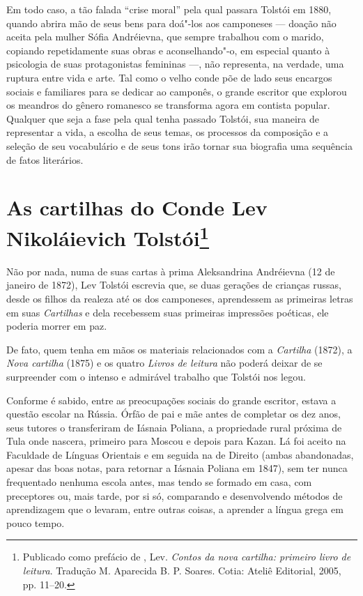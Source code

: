 Em todo caso, a tão falada ``crise moral'' pela qual passara
Tolstói em 1880, quando abrira mão de seus bens para doá"-los
aos camponeses --- doação não aceita pela mulher Sófia Andréievna,
que sempre trabalhou com o marido, copiando repetidamente suas
obras e aconselhando"-o, em especial quanto à psicologia de suas
protagonistas femininas ---, não representa, na verdade, uma
ruptura entre vida e arte. Tal como o velho conde põe de lado
seus encargos sociais e familiares para se dedicar ao camponês,
o grande escritor que explorou os meandros do gênero romanesco
se transforma agora em contista popular. Qualquer que seja a
fase pela qual tenha passado Tolstói, sua maneira de
representar a vida, a escolha de seus temas, os processos da
composição e a seleção de seu vocabulário e de seus tons irão
tornar sua biografia uma sequência de fatos literários.

\chapter{As cartilhas do Conde Lev Nikoláievich Tolstói\footnote{Publicado como prefácio de \protect{}, Lev. \emph{Contos da nova cartilha: primeiro livro de leitura}. Tradução M. Aparecida B. P. Soares. Cotia: Ateliê Editorial, 2005, pp. 11--20.}}
\label{cartilhas}

Não por nada, numa de suas cartas à prima Aleksandrina Andréievna
(12 de janeiro de 1872), Lev Tolstói escrevia que, se
duas gerações de crianças russas, desde os filhos da realeza até
os dos camponeses, aprendessem as primeiras letras em suas
\emph{Cartilhas} e dela recebessem suas primeiras impressões
poéticas, ele poderia morrer em paz.

De fato, quem tenha em mãos os materiais relacionados com
a \emph{Cartilha} (1872), a \emph{Nova cartilha} (1875) e os
quatro \emph{Livros de leitura} não poderá deixar de se
surpreender com o intenso e admirável trabalho que Tolstói nos legou.

Conforme é sabido, entre as preocupações sociais do grande
escritor, estava a questão escolar na Rússia. Órfão de pai e
mãe antes de completar os dez anos, seus tutores o transferiram
de Iásnaia Poliana, a propriedade rural próxima de Tula onde
nascera, primeiro para Moscou e depois para Kazan. Lá foi
aceito na Faculdade de Línguas Orientais e em seguida na de
Direito (ambas abandonadas, apesar das boas notas, para retornar
a Iásnaia Poliana em 1847), sem ter nunca frequentado nenhuma
escola antes, mas tendo se formado em casa, com preceptores ou,
mais tarde, por si só, comparando e desenvolvendo métodos de
aprendizagem que o levaram, entre outras coisas, a aprender a
língua grega em pouco tempo. 

